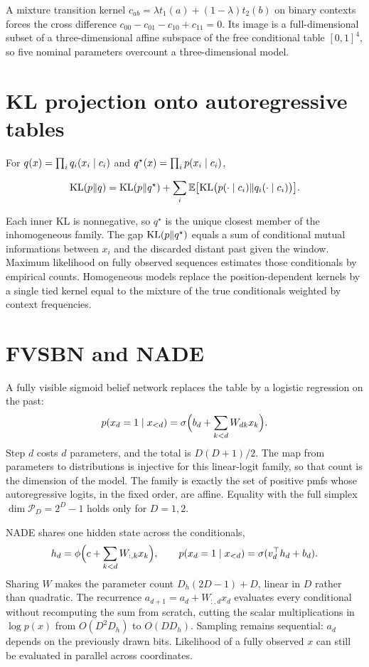 A mixture transition kernel $c_{ab}=\lambda t_1(a)+(1-\lambda)t_2(b)$ on binary contexts forces the cross difference $c_{00}-c_{01}-c_{10}+c_{11}=0$. Its image is a full-dimensional subset of a three-dimensional affine subspace of the free conditional table $[0,1]^4$, so five nominal parameters overcount a three-dimensional model.

\section{KL projection onto autoregressive tables}

For $q(x)=\prod_i q_i(x_i\mid c_i)$ and $q^\star(x)=\prod_i p(x_i\mid c_i)$,
\begin{resultbox}
\[
\mathrm{KL}(p\Vert q)=\mathrm{KL}(p\Vert q^\star)+\sum_i\mathbb{E}\bigl[\mathrm{KL}\bigl(p(\cdot\mid c_i)\Vert q_i(\cdot\mid c_i)\bigr)\bigr].
\]
\end{resultbox}
Each inner KL is nonnegative, so $q^\star$ is the unique closest member of the inhomogeneous family. The gap $\mathrm{KL}(p\Vert q^\star)$ equals a sum of conditional mutual informations between $x_i$ and the discarded distant past given the window. Maximum likelihood on fully observed sequences estimates those conditionals by empirical counts. Homogeneous models replace the position-dependent kernels by a single tied kernel equal to the mixture of the true conditionals weighted by context frequencies.

\section{FVSBN and NADE}

A fully visible sigmoid belief network replaces the table by a logistic regression on the past:
\[
p(x_d=1\mid x_{<d})=\sigma\Bigl(b_d+\sum_{k<d}W_{dk}x_k\Bigr).
\]
Step $d$ costs $d$ parameters, and the total is $D(D+1)/2$. The map from parameters to distributions is injective for this linear-logit family, so that count is the dimension of the model. The family is exactly the set of positive pmfs whose autoregressive logits, in the fixed order, are affine. Equality with the full simplex $\dim\mathcal P_D=2^D-1$ holds only for $D=1,2$.

NADE shares one hidden state across the conditionals,
\[
h_d=\phi\Bigl(c+\sum_{k<d}W_{:,k}x_k\Bigr),\qquad
p(x_d=1\mid x_{<d})=\sigma(v_d^\top h_d+b_d).
\]
Sharing $W$ makes the parameter count $D_h(2D-1)+D$, linear in $D$ rather than quadratic. The recurrence $a_{d+1}=a_d+W_{:,d}x_d$ evaluates every conditional without recomputing the sum from scratch, cutting the scalar multiplications in $\log p(x)$ from $O(D^2 D_h)$ to $O(D D_h)$. Sampling remains sequential: $a_d$ depends on the previously drawn bits. Likelihood of a fully observed $x$ can still be evaluated in parallel across coordinates.

